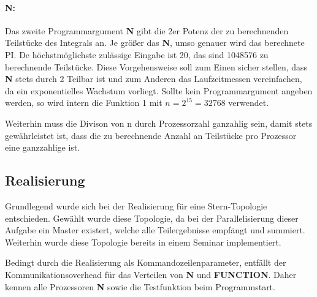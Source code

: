 \paragraph{N:}
Das zweite Programmargument \textbf{N} gibt die 2er Potenz der zu berechnenden Teilstücke des Integrals an.
Je größer das \textbf{N}, umso genauer wird das berechnete PI.
De höchstmöglichste zulässige Eingabe ist 20, das sind 1048576 zu berechnende Teilstücke.
Diese Vorgehensweise soll zum Einen sicher stellen, dass \textbf{N} stets durch 2 Teilbar ist und zum Anderen das Laufzeitmessen vereinfachen, da ein exponentielles Wachstum vorliegt.
Sollte kein Programmargument angeben werden, so wird intern die Funktion 1 mit $n = 2^{15} = 32768$ verwendet.

Weiterhin muss die Divison von n durch Prozessorzahl ganzahlig sein, damit stets gewährleistet ist, dass die zu berechnende Anzahl an Teilstücke pro Prozessor eine ganzzahlige ist.

\subsection{Realisierung}
\label{ref:realisierung}
Grundlegend wurde sich bei der Realisierung für eine Stern-Topologie entschieden.
Gewählt wurde diese Topologie, da bei der Parallelisierung dieser Aufgabe ein Master existert, welche alle Teilergebnisse empfängt und summiert.
Weiterhin wurde diese Topologie bereits in einem Seminar implementiert.

Bedingt durch die Realisierung als Kommandozeilenparameter, entfällt der Kommunikationsoverhead für das Verteilen von \textbf{N} und \textbf{FUNCTION}.
Daher kennen alle Prozessoren \textbf{N} sowie die Testfunktion beim Programmstart.

